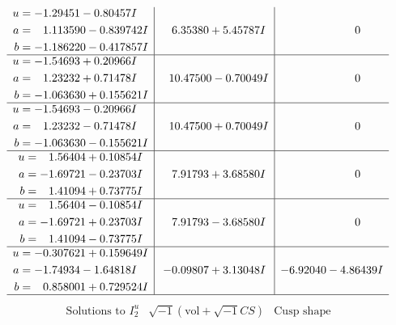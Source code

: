 \documentclass[1p]{elsarticle_modified}
\theoremstyle{definition}
\newcommand{\I}{\sqrt{-1}}
\begin{document}
$$\begin{array}{c|c|c}
\begin{aligned}
u &= -1.29451 - 0.80457 I \\
a &= \phantom{-}1.113590 - 0.839742 I \\
b &= -1.186220 - 0.417857 I\end{aligned}
 & \phantom{-}6.35380 + 5.45787 I & \phantom{-0.000000 } 0 \\ \hline\begin{aligned}
u &= -1.54693 + 0.20966 I \\
a &= \phantom{-}1.23232 + 0.71478 I \\
b &= -1.063630 + 0.155621 I\end{aligned}
 & \phantom{-}10.47500 - 0.70049 I & \phantom{-0.000000 } 0 \\ \hline\begin{aligned}
u &= -1.54693 - 0.20966 I \\
a &= \phantom{-}1.23232 - 0.71478 I \\
b &= -1.063630 - 0.155621 I\end{aligned}
 & \phantom{-}10.47500 + 0.70049 I & \phantom{-0.000000 } 0 \\ \hline\begin{aligned}
u &= \phantom{-}1.56404 + 0.10854 I \\
a &= -1.69721 - 0.23703 I \\
b &= \phantom{-}1.41094 + 0.73775 I\end{aligned}
 & \phantom{-}7.91793 + 3.68580 I & \phantom{-0.000000 } 0 \\ \hline\begin{aligned}
u &= \phantom{-}1.56404 - 0.10854 I \\
a &= -1.69721 + 0.23703 I \\
b &= \phantom{-}1.41094 - 0.73775 I\end{aligned}
 & \phantom{-}7.91793 - 3.68580 I & \phantom{-0.000000 } 0 \\ \hline\begin{aligned}
u &= -0.307621 + 0.159649 I \\
a &= -1.74934 - 1.64818 I \\
b &= \phantom{-}0.858001 + 0.729524 I\end{aligned}
 & -0.09807 + 3.13048 I & -6.92040 - 4.86439 I\\
 \hline 
 \end{array}$$\newpage$$\begin{array}{c|c|c}  
\text{Solutions to }I^u_{2}& \I (\text{vol} + \sqrt{-1}CS) & \text{Cusp shape}\\
 \hline 
\begin{aligned}

\end{aligned}
\end{array}$$
\end{document}
